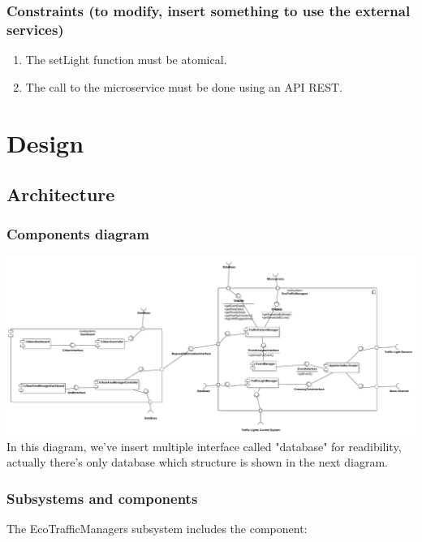 \documentclass[12pt, a4paper, twoside, openright]{report}
\begin{document}
\subsection{Constraints (to modify, insert something to use the
external services)}

\begin{enumerate}
\item
  The setLight function must be atomical.
\item
  The call to the microservice must be done using an API REST.
\end{enumerate}

\chapter{Design}

\section{Architecture}
\subsection{Components diagram}

\includegraphics[width=\linewidth]{images/svg/component_diagram.pdf}
In this diagram, we've insert multiple interface called "database" for readibility, actually there's only database which
structure is shown in the next diagram.\\
\subsection{Subsystems and components}

The EcoTrafficManagers subsystem includes the component:
\end{document}

